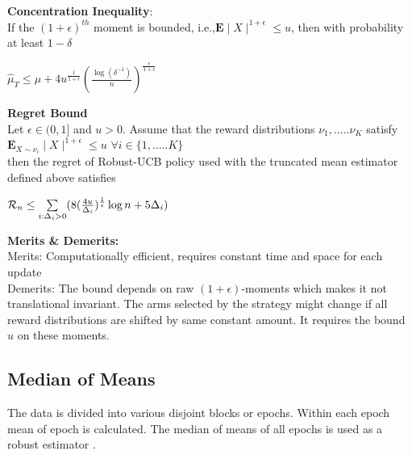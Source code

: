 \documentclass[11pt]{article}
\begin{document}
\begin{flushleft}
\textbf{Concentration Inequality}:\\
If the $(1+\epsilon)^{th}$ moment is bounded, i.e.,$\mathbf{E} \mid X \mid^{1+\epsilon} \leq u$, then with probability at least $1- \delta $
\end{flushleft}

$\hat\mu_{T} \leq \mu + 4u^{\frac{1}{1+\epsilon}}(\frac{\log(\delta^{-1})}{n})^{\frac{\epsilon}{1+\epsilon}}$\\
\begin{flushleft}
\textbf{Regret Bound}\\
Let $\epsilon \in (0,1]$ and $u > 0$. Assume that the reward distributions $\nu_{1},.....\nu_{K}$ satisfy
$\mathbf{E}_{X\sim\nu_{i}} \mid X \mid ^{1+\epsilon} \leq u $ $\forall i \in \{1,.....K\}$\\

then the regret of Robust-UCB policy used with the truncated mean estimator defined above satisfies\\
\end{flushleft}

$\mathcal{R}_{n} \leq \sum\limits_{i: \Delta_{i} >0} (8(\frac{4u}{\Delta_{i}})^{\frac{1}{\epsilon}}\log n + 5\Delta_{i})$\\
\begin{flushleft}
\textbf{Merits \& Demerits:\\}
Merits: Computationally efficient, requires constant time and space for each update\\
Demerits: The bound depends on raw $(1+\epsilon)$-moments which makes it not translational invariant. The arms selected by the strategy might change if all reward distributions are shifted by same constant amount. It requires the bound $u$ on these moments. 
\end{flushleft}

\subsection{Median of Means}
The data is divided into various disjoint blocks or epochs. Within each epoch mean of epoch is calculated. The median of means of all epochs is used as a robust estimator .\\
\end{document}
